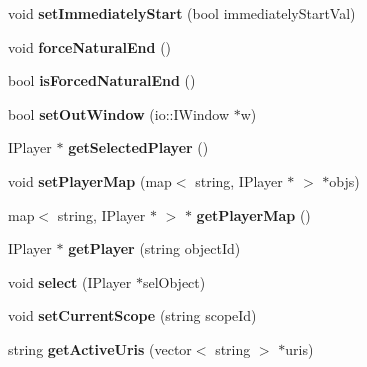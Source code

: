 \begin{CompactItemize}
\item 
void \textbf{setImmediatelyStart} (bool immediatelyStartVal)\label{classbr_1_1pucrio_1_1telemidia_1_1ginga_1_1ncl_1_1FormatterMediator_4c4dc3e37c8c5d01c40664f07ea69f02}

\item 
void \textbf{forceNaturalEnd} ()\label{classbr_1_1pucrio_1_1telemidia_1_1ginga_1_1ncl_1_1FormatterMediator_d83cefb419838cb8be6cc40109d45f68}

\item 
bool \textbf{isForcedNaturalEnd} ()\label{classbr_1_1pucrio_1_1telemidia_1_1ginga_1_1ncl_1_1FormatterMediator_2571def1663245ef08fce9616e369f4b}

\item 
bool \textbf{setOutWindow} (io::IWindow $\ast$w)\label{classbr_1_1pucrio_1_1telemidia_1_1ginga_1_1ncl_1_1FormatterMediator_e70356cfb2fbcf98264b8c7a60d6f1bd}

\item 
IPlayer $\ast$ {\bf getSelectedPlayer} ()\label{classbr_1_1pucrio_1_1telemidia_1_1ginga_1_1ncl_1_1FormatterMediator_1768d946739b56778d099e36b3d80dbb}

\item 
void {\bf setPlayerMap} (map$<$ string, IPlayer $\ast$ $>$ $\ast$objs)\label{classbr_1_1pucrio_1_1telemidia_1_1ginga_1_1ncl_1_1FormatterMediator_d3b726e0e72999d6de4be877f0b0087c}

\item 
map$<$ string, IPlayer $\ast$ $>$ $\ast$ {\bf getPlayerMap} ()\label{classbr_1_1pucrio_1_1telemidia_1_1ginga_1_1ncl_1_1FormatterMediator_623ad836859032416d542e1f261d0848}

\item 
IPlayer $\ast$ {\bf getPlayer} (string objectId)\label{classbr_1_1pucrio_1_1telemidia_1_1ginga_1_1ncl_1_1FormatterMediator_2d5ec5b3d86f05e9a22ac93e3aabbf88}

\item 
void {\bf select} (IPlayer $\ast$selObject)\label{classbr_1_1pucrio_1_1telemidia_1_1ginga_1_1ncl_1_1FormatterMediator_f4092baaf98a4b73dfda1ea7bf3d561c}

\item 
void \textbf{setCurrentScope} (string scopeId)\label{classbr_1_1pucrio_1_1telemidia_1_1ginga_1_1ncl_1_1FormatterMediator_e93ade91c50e4c8ea19db767c126933c}

\item 
string \textbf{getActiveUris} (vector$<$ string $>$ $\ast$uris)\label{classbr_1_1pucrio_1_1telemidia_1_1ginga_1_1ncl_1_1FormatterMediator_b0154112a5ecc256eff34441deba988f}


\end{CompactItemize}

